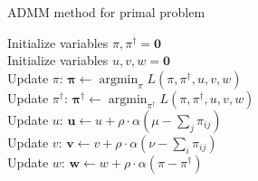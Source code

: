 \vspace{2ex}
    \begin{algorithm}[htbp]
        \SetAlgoNoLine
        \caption{ADMM method for primal problem} 
        Initialize variables $\pi, \pi^{\dagger} = \boldsymbol{0}$\\
        Initialize variables $u, v, w = \boldsymbol{0}$\\
        {  
            Update $\pi$: $\boldsymbol{\pi} \leftarrow \operatorname{argmin}_{\pi} L(\pi, \pi^{\dagger}, u, v, w)$\\
            Update $\pi^{\dagger}$: $\boldsymbol{\pi}^{\dagger} \leftarrow \operatorname{argmin}_{\pi^{\dagger}} L(\pi, \pi^{\dagger}, u, v, w)$\\
            Update $u$: $\boldsymbol{u} \leftarrow u + \rho\cdot \alpha (\mu - \sum_j \pi_{ij})$\\
            Update $v$: $\boldsymbol{v} \leftarrow v + \rho\cdot \alpha (\nu - \sum_i \pi_{ij})$\\
            Update $w$: $\boldsymbol{w} \leftarrow w + \rho\cdot \alpha (\pi - \pi^{\dagger})$\\
        }
    \end{algorithm}